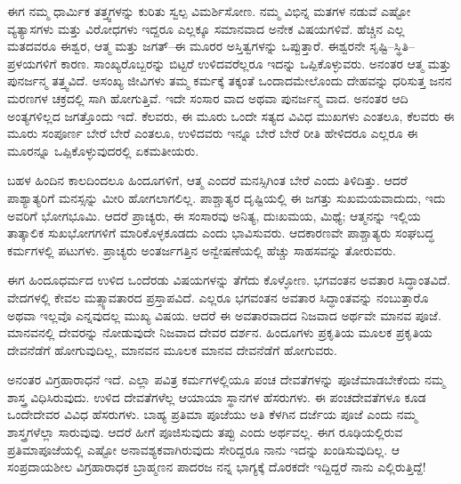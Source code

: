 \newpage

ಈಗ ನಮ್ಮ ಧಾರ್ಮಿಕ ತತ್ತ್ವಗಳನ್ನು ಕುರಿತು ಸ್ವಲ್ಪ ವಿಮರ್ಶಿಸೋಣ. ನಮ್ಮ ವಿಭಿನ್ನ ಮತಗಳ ನಡುವೆ ಎಷ್ಟೋ ವ್ಯತ್ಯಾಸಗಳು ಮತ್ತು ವಿರೋಧಗಳು ಇದ್ದರೂ ಎಲ್ಲಕ್ಕೂ ಸಮಾನವಾದ ಅನೇಕ ವಿಷಯಗಳಿವೆ. ಹೆಚ್ಚಿನ ಎಲ್ಲ ಮತದವರೂ ಈಶ್ವರ, ಆತ್ಮ ಮತ್ತು ಜಗತ್​–ಈ ಮೂರರ ಅಸ್ತಿತ್ವಗಳನ್ನು ಒಪ್ಪುತ್ತಾರೆ. ಈಶ್ವರನೇ ಸೃಷ್ಟಿ–ಸ್ಥಿತಿ–ಪ್ರಳಯಗಳಿಗೆ ಕಾರಣ. ಸಾಂಖ್ಯರೊಬ್ಬರನ್ನು ಬಿಟ್ಟರೆ ಉಳಿದವರೆಲ್ಲರೂ ಇದನ್ನು ಒಪ್ಪಿಕೊಳ್ಳುವರು. ಅನಂತರ ಆತ್ಮ ಮತ್ತು ಪುನರ್ಜನ್ಮ ತತ್ತ್ವವಿದೆ. ಅಸಂಖ್ಯ ಜೀವಿಗಳು ತಮ್ಮ ಕರ್ಮಕ್ಕೆ ತಕ್ಕಂತೆ ಒಂದಾದಮೇಲೊಂದು ದೇಹವನ್ನು ಧರಿಸುತ್ತ ಜನನ ಮರಣಗಳ ಚಕ್ರದಲ್ಲಿ ಸಾಗಿ ಹೋಗುತ್ತಿವೆ. ಇದೇ ಸಂಸಾರ ವಾದ ಅಥವಾ ಪುನರ್ಜನ್ಮ ವಾದ. ಅನಂತರ ಆದಿ ಅಂತ್ಯಗಳಿಲ್ಲದ ಜಗತ್ತೊಂದು ಇದೆ. ಕೆಲವರು, ಈ ಮೂರು ಒಂದೇ ಸತ್ಯದ ವಿವಿಧ ಮುಖಗಳು ಎಂತಲೂ, ಕೆಲವರು ಈ ಮೂರು ಸಂಪೂರ್ಣ ಬೇರೆ ಬೇರೆ ಎಂತಲೂ, ಉಳಿದವರು ಇನ್ನೂ ಬೇರೆ ಬೇರೆ ರೀತಿ ಹೇಳಿದರೂ ಎಲ್ಲರೂ ಈ ಮೂರನ್ನೂ ಒಪ್ಪಿಕೊಳ್ಳುವುದರಲ್ಲಿ ಏಕಮತೀಯರು.

\vskip 4pt

ಬಹಳ ಹಿಂದಿನ ಕಾಲದಿಂದಲೂ ಹಿಂದೂಗಳಿಗೆ, ಆತ್ಮ ಎಂದರೆ ಮನಸ್ಸಿಗಿಂತ ಬೇರೆ ಎಂದು ತಿಳಿದಿತ್ತು. ಆದರೆ ಪಾಶ್ಯಾತ್ಯರಿಗೆ ಮನಸ್ಸನ್ನು ಮೀರಿ ಹೋಗಲಾಗಲಿಲ್ಲ. ಪಾಶ್ಚಾತ್ಯರ ದೃಷ್ಟಿಯಲ್ಲಿ ಈ ಜಗತ್ತು ಸುಖಮಯವಾದುದು, ಇದು ಅವರಿಗೆ ಭೋಗಭೂಮಿ. ಆದರೆ ಪ್ರಾಚ್ಯರು, ಈ ಸಂಸಾರವು ಅನಿತ್ಯ, ದುಃಖಮಯ, ಮಿಥ್ಯೆ; ಆತ್ಮನನ್ನು ಇಲ್ಲಿಯ ತಾತ್ಕಾಲಿಕ ಸುಖಭೋಗಗಳಿಗೆ ಮಾರಿಕೊಳ್ಳಕೂಡದು ಎಂದು ಭಾವಿಸುವರು. ಆದಕಾರಣವೇ ಪಾಶ್ಚಾತ್ಯರು ಸಂಘಬದ್ಧ ಕರ್ಮಗಳಲ್ಲಿ ಪಟುಗಳು. ಪ್ರಾಚ್ಯರು ಅಂತರ್ಜಗತ್ತಿನ ಅನ್ವೇಷಣೆಯಲ್ಲಿ ಹೆಚ್ಚು ಸಾಹಸವನ್ನು ತೋರುವರು.

\vskip 4pt

ಈಗ ಹಿಂದೂಧರ್ಮದ ಉಳಿದ ಒಂದೆರಡು ವಿಷಯಗಳನ್ನು ತೆಗೆದು ಕೊಳ್ಳೋಣ. ಭಗವಂತನ ಅವತಾರ ಸಿದ್ಧಾಂತವಿದೆ. ವೇದಗಳಲ್ಲಿ ಕೇವಲ ಮತ್ಸ್ಯಾವತಾರದ ಪ್ರಸ್ತಾಪವಿದೆ. ಎಲ್ಲರೂ ಭಗವಂತನ ಅವತಾರ ಸಿದ್ಧಾಂತವನ್ನು ನಂಬುತ್ತಾರೊ ಅಥವಾ ಇಲ್ಲವೊ ಎನ್ನವುದಲ್ಲ ಮುಖ್ಯ ವಿಷಯ. ಆದರೆ ಈ ಅವತಾರವಾದದ ನಿಜವಾದ ಅರ್ಥವೇ ಮಾನವ ಪೂಜೆ. ಮಾನವನಲ್ಲಿ ದೇವರನ್ನು ನೋಡುವುದೇ ನಿಜವಾದ ದೇವರ ದರ್ಶನ. ಹಿಂದೂಗಳು ಪ್ರಕೃತಿಯ ಮೂಲಕ ಪ್ರಕೃತಿಯ ದೇವನೆಡೆಗೆ ಹೋಗುವುದಿಲ್ಲ, ಮಾನವನ ಮೂಲಕ ಮಾನವ ದೇವನೆಡೆಗೆ ಹೋಗುವರು.

\vskip 4pt

ಅನಂತರ ವಿಗ್ರಹಾರಾಧನೆ ಇದೆ. ಎಲ್ಲಾ ಪವಿತ್ರ ಕರ್ಮಗಳಲ್ಲಿಯೂ ಪಂಚ ದೇವತೆಗಳನ್ನು ಪೂಜೆಮಾಡಬೇಕೆಂದು ನಮ್ಮ ಶಾಸ್ತ್ರ ವಿಧಿಸಿರುವುದು. ಉಳಿದ ದೇವತೆಗಳೆಲ್ಲ ಆಯಾಯಾ ಸ್ಥಾನಗಳ ಹೆಸರುಗಳು. ಈ ಪಂಚದೇವತೆಗಳೂ ಕೂಡ ಒಂದೇದೇವರ ವಿವಿಧ ಹೆಸರುಗಳು. ಬಾಹ್ಯ ಪ್ರತಿಮಾ ಪೂಜೆಯು ಅತಿ ಕೆಳಗಿನ ದರ್ಜೆಯ ಪೂಜೆ ಎಂದು ನಮ್ಮ ಶಾಸ್ತ್ರಗಳೆಲ್ಲಾ ಸಾರುವುವು. ಆದರೆ ಹೀಗೆ ಪೂಜಿಸುವುದು ತಪ್ಪು ಎಂದು ಅರ್ಥವಲ್ಲ. ಈಗ ರೂಢಿಯಲ್ಲಿರುವ ಪ್ರತಿಮಾಪೂಜೆಯಲ್ಲಿ ಎಷ್ಟೋ ಅನಾವಶ್ಯಕವಾಗಿರುವುದು ಸೇರಿದ್ದರೂ ನಾನು ಇದನ್ನು ಖಂಡಿಸುವುದಿಲ್ಲ. ಆ ಸಂಪ್ರದಾಯಶೀಲ ವಿಗ್ರಹಾರಾಧಕ ಬ್ರಾಹ್ಮಣನ ಪಾದರಜ ನನ್ನ ಭಾಗ್ಯಕ್ಕೆ ದೊರಕದೇ ಇದ್ದಿದ್ದರೆ ನಾನು ಎಲ್ಲಿರುತ್ತಿದ್ದೆ!

